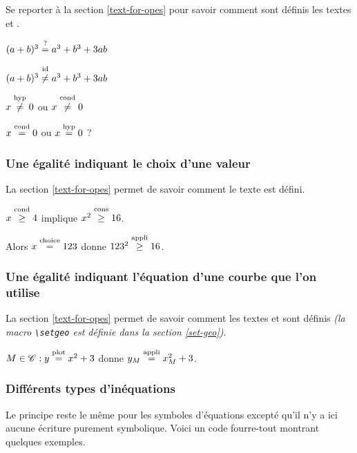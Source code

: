 \documentclass[12pt,a4paper]{article}
\theoremstyle{definition}
\begin{document}
Se reporter à la section \ref{text-for-opes} pour savoir comment sont définis les textes \emph{\og \textopcond \fg} et \emph{\og \textophyp \fg}.

\begin{latexex}
$(a + b)^3 \eqtest a^3 + b^3 + 3 a b$

$(a + b)^3 \neqid a^3 + b^3 + 3 a b$

$x \neqhyp 0$ ou $x \neqcond 0$

$x \eqcond 0$ ou $x \eqhyp 0$ ?
\end{latexex}




\subsubsection{Une égalité indiquant le choix d'une valeur}

La section \ref{text-for-opes} permet de savoir comment le texte \emph{\og \textopchoice \fg} est défini.

\begin{latexex}
$x \geqcond 4$ implique
$x^2 \geqcons 16$.

Alors $x \eqchoice 123$ donne
$123^2 \geqappli 16$.
\end{latexex}




\subsubsection{Une égalité indiquant l'équation d'une courbe que l'on utilise}

La section \ref{text-for-opes} permet de savoir comment les textes \emph{\og \textopplot \fg} et \emph{\og \textopappli \fg} sont définis \emph{(la macro \emph{\texttt{\textbackslash{}setgeo}} est définie dans la section \ref{set-geo})}.

\begin{latexex}
$M \in \setgeo{C}: y \eqplot x^2 + 3$
donne
$y_M \eqappli x_M^2 + 3$.
\end{latexex}




\subsubsection{Différents types d'inéquations}

Le principe reste le même pour les symboles d'équations excepté qu'il n'y a ici aucune écriture purement symbolique. Voici un code \og fourre-tout \fg{} montrant quelques exemples.
\end{document}
